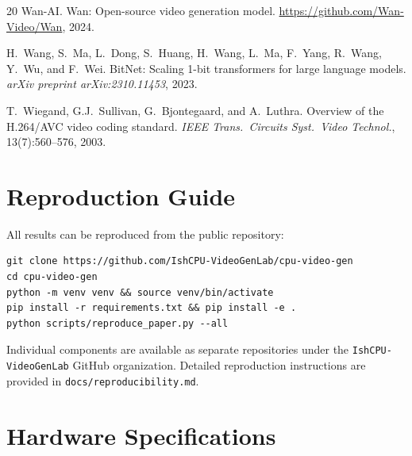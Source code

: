 \documentclass[11pt]{article}
\begin{document}
\begin{thebibliography}{20}
{Wan-AI}.
\newblock Wan: Open-source video generation model.
\newblock \url{https://github.com/Wan-Video/Wan}, 2024.

H.~Wang, S.~Ma, L.~Dong, S.~Huang, H.~Wang, L.~Ma, F.~Yang, R.~Wang, Y.~Wu, and F.~Wei.
\newblock Bit{N}et: Scaling 1-bit transformers for large language models.
\newblock \emph{arXiv preprint arXiv:2310.11453}, 2023.

T.~Wiegand, G.J.~Sullivan, G.~Bjontegaard, and A.~Luthra.
\newblock Overview of the {H.264/AVC} video coding standard.
\newblock \emph{IEEE Trans.\ Circuits Syst.\ Video Technol.}, 13(7):560--576, 2003.

\end{thebibliography}


\appendix

\section{Reproduction Guide}

All results can be reproduced from the public repository:

\begin{verbatim}
git clone https://github.com/IshCPU-VideoGenLab/cpu-video-gen
cd cpu-video-gen
python -m venv venv && source venv/bin/activate
pip install -r requirements.txt && pip install -e .
python scripts/reproduce_paper.py --all
\end{verbatim}

Individual components are available as separate repositories under the \texttt{IshCPU-VideoGenLab} GitHub organization. Detailed reproduction instructions are provided in \texttt{docs/reproducibility.md}.

\section{Hardware Specifications}
\end{document}

